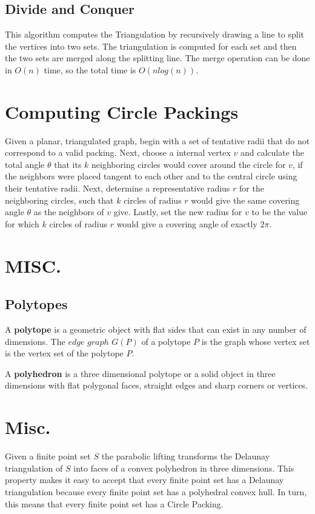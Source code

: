 \documentclass[english]{article}
\begin{document}
\subsection{Divide and Conquer}
This algorithm computes the Triangulation by recursively drawing a line to split the vertices into two sets. The triangulation is computed for each set and then the two sets are merged along the splitting line. The merge operation can be done in $O(n)$ time, so the total time is $O(nlog(n))$.

\section{Computing Circle Packings}
Given a planar, triangulated graph, begin with a set of tentative radii that do not correspond to a valid packing. Next, choose a internal vertex $v$ and calculate the total angle $\theta$ that its $k$ neighboring circles would cover around the circle for $v$, if the neighbors were placed tangent to each other and to the central circle using their tentative radii. Next, determine a representative radius $r$ for the neighboring circles, such that $k$ circles of radius $r$ would give the same covering angle $\theta$ as the neighbors of $v$ give. Lastly, set the new radius for $v$ to be the value for which $k$ circles of radius $r$ would give a covering angle of exactly $2\pi$.
\section{MISC.}
\subsection{Polytopes}
  A \textbf{polytope} is a geometric object with flat sides that can exist in any number of dimensions. The $edge$ $graph$ $G(P)$ of a polytope $P$ is the graph whose vertex set is the vertex set of the polytope $P$. 
  
 A \textbf{polyhedron} is a three dimensional polytope or a solid object in three dimensions with flat polygonal faces, straight edges and sharp corners or vertices.
 
 
 
 \section{Misc.}
Given a finite point set $S$ the parabolic lifting transforms the Delaunay triangulation of $S$ into faces of a convex polyhedron in three dimensions. This property makes it easy to accept that every finite point set has a Delaunay triangulation because every finite point set has a polyhedral convex hull. In turn, this means that every finite point set has a Circle Packing.
\end{document}
